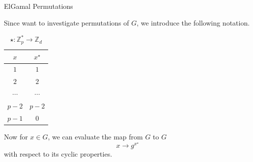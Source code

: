 \begin{frame}{ElGamal Permutations}

Since want to investigate permutations of $G$, we introduce the following notation.
\vspace{10pt}

\begin{minipage}{.5\textwidth}
	\begin{table}[]
	    \centering
	    \begin{tabular}{c|c}
	        $x$ & $x^\star$ \\ \hline \hline
	        $1$ & $1$ \\
	        $2$ & $2$ \\
	        $\cdots$ & $\cdots$ \\
	        $p-2$ & $p-2$ \\
	        $p-1$ & $0$ 
	    \end{tabular}
	     \caption{$\star: \mathbb{Z}_p^* \rightarrow \mathbb{Z}_d$}
	    \label{tab:xmap}
	\end{table}
\end{minipage}%
\begin{minipage}{0.5\textwidth}
    Now for $x\in G$, we can evaluate the map from $G$ to $G$
    $$x \to g^{x^\star}$$ 
     with respect to its cyclic properties.
\end{minipage}

    
\end{frame}



